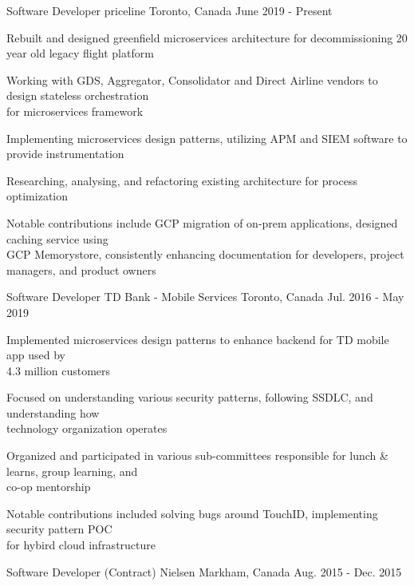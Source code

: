 \begin{cventries}
  \cventry
    {Software Developer}
    {priceline}
    {Toronto, Canada}
    {June 2019 - Present}
    {
      \begin{cvitems}
        \item {Rebuilt and designed greenfield microservices architecture for decommissioning 20 year old legacy flight platform}
        \item {Working with GDS, Aggregator, Consolidator and Direct Airline vendors to design stateless orchestration \\for microservices framework}
        \item {Implementing microservices design patterns, utilizing APM and SIEM software to provide instrumentation}
        \item {Researching, analysing, and refactoring existing architecture  for process optimization}
        \item {Notable contributions include GCP migration of on-prem applications, designed caching service using \\GCP Memorystore, consistently enhancing documentation for developers, project managers, and product owners}
      \end{cvitems}
    }
  \cventry
    {Software Developer}
    {TD Bank - Mobile Services}
    {Toronto, Canada}
    {Jul. 2016 - May 2019}
    {
      \begin{cvitems}
        \item {Implemented microservices design patterns to enhance backend for TD mobile app used by \\4.3 million customers}
        \item {Focused on understanding various security patterns, following SSDLC, and understanding how \\technology organization operates}
        \item {Organized and participated in various sub-committees responsible for lunch \& learns, group learning, and \\co-op mentorship}
        \item {Notable contributions included solving bugs around TouchID, implementing security pattern POC \\for hybird cloud infrastructure}
      \end{cvitems}
    }
  \cventry
    {Software Developer (Contract)}
    {Nielsen}
    {Markham, Canada}
    {Aug. 2015 - Dec. 2015}
    {
      \begin{cvitems}

\end{cvitems}}
\end{cventries}
